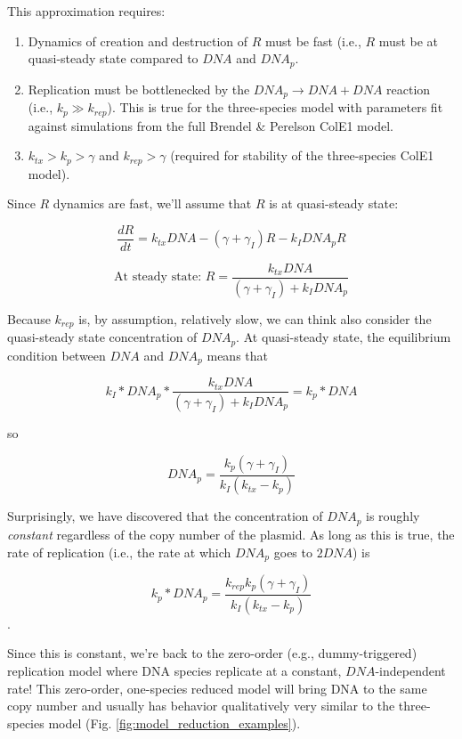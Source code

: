 \documentclass[preprint,12pt]{oldplainarticle}
\begin{document}
This approximation requires:
\begin{enumerate}
	\item Dynamics of creation and destruction of $R$ must be fast (i.e., $R$ must be at quasi-steady state compared to $DNA$ and $DNA_p$. 
	\item Replication must be bottlenecked by the $DNA_p \to DNA + DNA$ reaction (i.e., $k_p \gg k_{rep}$). This is true for the three-species model with parameters fit against simulations from the full Brendel \& Perelson ColE1 model.
	\item $k_{tx} > k_p > \gamma$ and $k_{rep} > \gamma$ (required for stability of the three-species ColE1 model). 
\end{enumerate}

Since $R$ dynamics are fast, we'll assume that $R$ is at quasi-steady state:

$$\frac{dR}{dt} = k_{tx} DNA - (\gamma+\gamma_I)R - k_I DNA_p R$$

$$\text{At steady state: } R = \frac{k_{tx}DNA}{(\gamma+\gamma_I) + k_IDNA_p}$$

Because $k_{rep}$ is, by assumption, relatively slow, we can think also consider the quasi-steady state concentration of $DNA_p$. At quasi-steady state, the equilibrium condition between $DNA$ and $DNA_p$ means that 

$$k_I*DNA_p*\frac{k_{tx}DNA}{(\gamma+\gamma_I) + k_IDNA_p} = k_p*DNA$$

so

$$DNA_p = \frac{k_p(\gamma + \gamma_I)}{k_I(k_{tx} - k_p)}$$

Surprisingly, we have discovered that the concentration of $DNA_p$ is roughly \emph{constant} regardless of the copy number of the plasmid. As long as this is true, the rate of replication (i.e., the rate at which $DNA_p$ goes to $2DNA$) is 

$$k_p * DNA_p = \frac{k_{rep}k_p(\gamma + \gamma_I)}{k_I(k_{tx} - k_p)}$$.

Since this is constant, we're back to the zero-order (e.g., dummy-triggered) replication model where DNA species replicate at a constant, $DNA$-independent rate! This zero-order, one-species reduced model will bring DNA to the same copy number and usually has behavior qualitatively very similar to the three-species model (Fig. \ref{fig:model_reduction_examples}).
\end{document}
